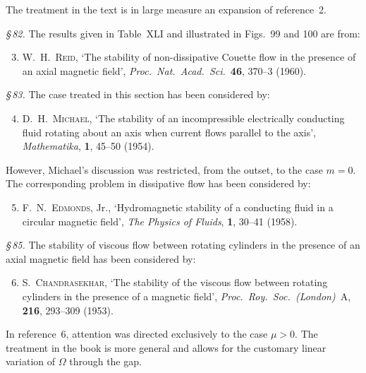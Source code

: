 \noindent The treatment in the text is in large measure an expansion of reference~2.

\noindent\textit{\S\,82.} The results given in Table~XLI and illustrated in Figs.~99 and 100 are from:

\begin{enumerate}
\setcounter{enumi}{2}
\item W.~H.~\textsc{Reid}, `The stability of non-dissipative Couette flow in the presence of an axial magnetic field', \textit{Proc.\ Nat.\ Acad.\ Sci.}\ \textbf{46}, 370--3 (1960).
\end{enumerate}

\noindent\textit{\S\,83.} The case treated in this section has been considered by:

\begin{enumerate}
\setcounter{enumi}{3}
\item D.~H.~\textsc{Michael}, `The stability of an incompressible electrically conducting fluid rotating about an axis when current flows parallel to the axis', \textit{Mathematika}, \textbf{1}, 45--50 (1954).
\end{enumerate}

\noindent However, Michael's discussion was restricted, from the outset, to the case $m = 0$. The corresponding problem in dissipative flow has been considered by:

\begin{enumerate}
\setcounter{enumi}{4}
\item F.~N.~\textsc{Edmonds}, Jr., `Hydromagnetic stability of a conducting fluid in a circular magnetic field', \textit{The Physics of Fluids}, \textbf{1}, 30--41 (1958).
\end{enumerate}

\noindent\textit{\S\,85.} The stability of viscous flow between rotating cylinders in the presence of an axial magnetic field has been considered by:

\begin{enumerate}
\setcounter{enumi}{5}
\item S.~\textsc{Chandrasekhar}, `The stability of the viscous flow between rotating cylinders in the presence of a magnetic field', \textit{Proc.\ Roy.\ Soc.\ (London)}~A, \textbf{216}, 293--309 (1953).
\end{enumerate}

\noindent In reference~6, attention was directed exclusively to the case $\mu > 0$. The treatment in the book is more general and allows for the customary linear variation of $\Omega$ through the gap.


